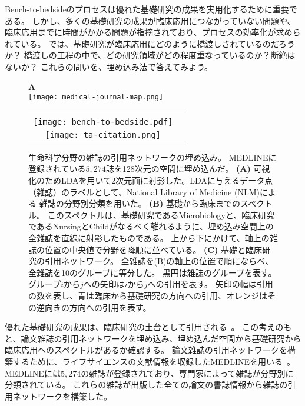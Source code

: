 \documentclass[J]{scitrans}
\def\legen#1{{\large \bf #1}}
\begin{document}
Bench-to-bedsideのプロセスは優れた基礎研究の成果を実用化するために重要である。
しかし、多くの基礎研究の成果が臨床応用につながっていない問題や、臨床応用までに時間がかかる問題が指摘されており、プロセスの効率化が求められている\cite{Khoury2007}。
では、基礎研究が臨床応用にどのように橋渡しされているのだろうか？
橋渡しの工程の中で、どの研究領域がどの程度重なっているのか？断絶はないか？
これらの問いを、埋め込み法で答えてみよう。

\begin{figure*}[h!]
    \centering
    \begin{minipage}{\hsize}
        \legen{A} \\
        \texttt{[image: medical-journal-map.png]} 
    \end{minipage}
    \begin{tabular}{cc}
        \begin{minipage}{0.5\hsize}
            \legen{B} \\
            \texttt{[image: bench-to-bedside.pdf]}
        \end{minipage}
        &
        \begin{minipage}{0.45\hsize}
            \legen{C} \\
            \texttt{[image: ta-citation.png]} 
        \end{minipage}
    \end{tabular}
    \caption{
        生命科学分野の雑誌の引用ネットワークの埋め込み。
        MEDLINEに登録されている$5,274$誌を128次元の空間に埋め込んだ。
        {\bf (A)} 可視化のためLDAを用いて2次元面に射影した。LDAに与えるデータ点（雑誌）のラベルとして、National Library of Medicine (NLM)による
        雑誌の分野別分類を用いた。
        {\bf (B)} 基礎から臨床までのスペクトル。
        このスペクトルは、基礎研究であるMicrobiologyと、臨床研究であるNursingとChildがなるべく離れるように、埋め込み空間上の全雑誌を直線に射影したものである。
        上から下にかけて、軸上の雑誌の位置の中央値で分野を降順に並べている。
        {\bf (C)} 基礎と臨床研究の引用ネットワーク。 全雑誌を(B)の軸上の位置で順にならべ、全雑誌を10のグループに等分した。
        黒円は雑誌のグループを表す。グループ$i$から$j$への矢印は$i$から$j$への引用を表す。
        矢印の幅は引用の数を表し、青は臨床から基礎研究の方向への引用、オレンジはその逆向きの方向への引用を表す。
    }
    \label{fig:journal-map}
\end{figure*}

優れた基礎研究の成果は、臨床研究の土台として引用される~\cite{Weber2013}。
この考えのもと、論文雑誌の引用ネットワークを埋め込み、埋め込んだ空間から基礎研究から臨床応用へのスペクトルがあるか確認する。
論文雑誌の引用ネットワークを構築するために、ライフサイエンスの文献情報を収録したMEDLINEを用いる~\cite{MEDLINE}。
MEDLINEには$5,274$の雑誌が登録されており、専門家によって雑誌が分野別に分類されている。
これらの雑誌が出版した全ての論文の書誌情報から雑誌の引用ネットワークを構築した。
\end{document}
